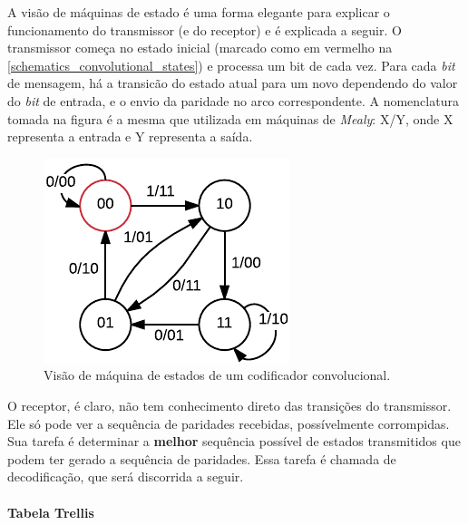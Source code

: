 	A visão de máquinas de estado é uma forma elegante para explicar o funcionamento do transmissor (e do receptor) e é explicada a seguir. O transmissor começa no estado inicial (marcado como em vermelho na \autoref{schematics_convolutional_states}) e processa um bit de cada vez. Para cada \textit{bit} de mensagem, há a transicão do estado atual para um novo dependendo do valor do \textit{bit} de entrada, e o envio da paridade no arco correspondente. A nomenclatura tomada na figura é a mesma que utilizada em máquinas de \textit{Mealy}: X/Y, onde X representa a entrada e Y representa a saída.
	\begin{figure}[htb]
		\caption{\label{schematics_convolutional_states} Visão de máquina de estados de um codificador convolucional.}
		\centering
		\includegraphics[width=0.4\textheight]{schematics/convolutional_states.pdf}
	\end{figure}
	O receptor, é claro, não tem conhecimento direto das transições do transmissor. Ele só pode ver a sequência de paridades recebidas, possívelmente corrompidas. Sua tarefa é determinar a \textbf{melhor} sequência possível de estados transmitidos que podem ter gerado a sequência de paridades. Essa tarefa é chamada de decodificação, que será discorrida a seguir.
	
	\paragraph{Tabela Trellis}

